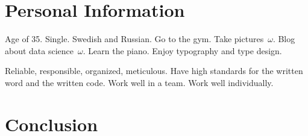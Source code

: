 \documentclass[journal]{IEEEtran}
\begin{document}
\section{Personal Information}

Age of 35. Single. Swedish and Russian. Go to the gym. Take pictures~$\omega$.
Blog about data science~$\omega$. Learn the piano. Enjoy typography and type
design.

Reliable, responsible, organized, meticulous. Have high standards for the
written word and the written code. Work well in a team. Work well individually.

\section{Conclusion}

\begingroup
  
  
\endgroup
\end{document}
